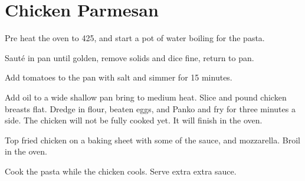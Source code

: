 \section{Chicken Parmesan}
\begin{recipe}


Pre heat the oven to 425\degree{}, and start a pot of water boiling for the pasta. 


Sauté in pan until golden, remove solids and dice fine, return to pan.


Add tomatoes to the pan with salt and simmer for 15 minutes.


Add oil to a wide shallow pan bring to medium heat. 
Slice and pound chicken breasts flat. 
Dredge in flour, beaten eggs, and Panko and fry for three minutes a side.
The chicken will not be fully cooked yet. It will finish in the oven. 


Top fried chicken on a baking sheet with some of the sauce, and mozzarella.
Broil in the oven. 


Cook the pasta while the chicken cools. 
Serve extra extra sauce.

\end{recipe}
